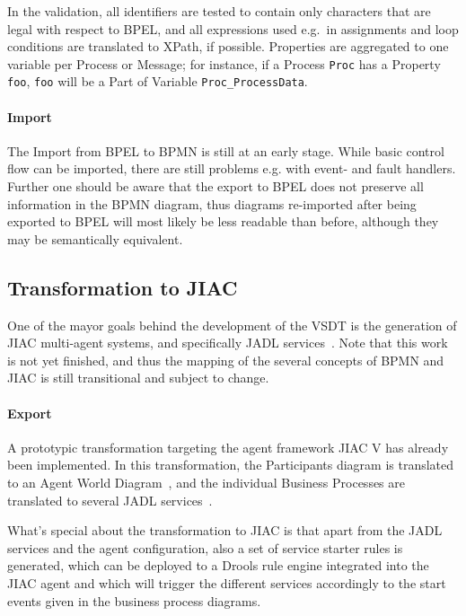 In the validation, all identifiers are tested to contain only characters that are
legal with respect to BPEL, and all expressions used e.g.\ in assignments and
loop conditions are translated to XPath, if possible.  Properties are aggregated
to one variable per Process or Message; for instance, if a Process \texttt{Proc}
has a Property \texttt{foo}, \texttt{foo} will be a Part of Variable
\texttt{Proc\_ProcessData}.

\paragraph{Import}
The Import from BPEL to BPMN is still at an early stage.  While basic control
flow can be imported, there are still problems e.g. with event- and fault handlers.
Further one should be aware that the export to BPEL does not preserve all
information in the BPMN diagram, thus diagrams re-imported after being exported
to BPEL will most likely be less readable than before, although they may be
semantically equivalent.


\subsection{Transformation to JIAC}
\label{sec:user_trafo_jiac}

One of the mayor goals behind the development of the VSDT is the generation of
JIAC multi-agent systems, and specifically JADL services~\cite{kuester2010integrating}.
Note that this work is not yet finished, and thus the mapping of the several
concepts of BPMN and JIAC is still transitional and subject to change.

\paragraph{Export}
A prototypic transformation targeting the agent framework JIAC V has already been
implemented.  In this transformation, the Participants diagram is translated to
an Agent World Diagram~\cite{lutzenberger2009unifying}, and the individual Business
Processes are translated to several JADL services~\cite{hirsch2010programming}.

What's special about the transformation to JIAC is that apart from the JADL
services and the agent configuration, also a set of service starter rules is
generated, which can be deployed to a Drools rule engine integrated into the JIAC
agent and which will trigger the different services accordingly to the start
events given in the business process diagrams.

